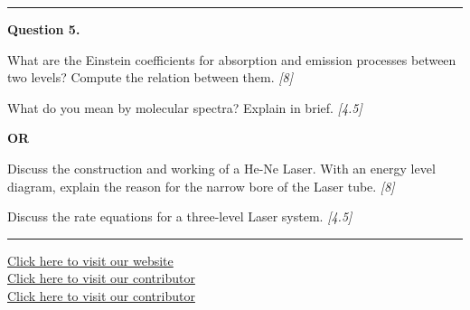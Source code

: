\documentclass[11pt,a4paper]{article}
\newcommand{\pts}[1]{\hfill   \textit{[#1]}}
\begin{document}
\medskip\rule{\linewidth}{0.2pt}




\noindent   \textbf{Question 5.}

\begin{parts}
  \item What are the Einstein coefficients for absorption and emission processes between two levels? Compute the relation between them. \pts{8}
  \item What do you mean by molecular spectra? Explain in brief. \pts{4.5}
\end{parts}
\hfill   \textbf{OR}

\begin{parts}
  \item Discuss the construction and working of a He-Ne Laser. With an energy level diagram, explain the reason for the narrow bore of the Laser tube. \pts{8}
  \item Discuss the rate equations for a three-level Laser system. \pts{4.5}
\end{parts}

\vfill
\rule{\linewidth}{0.4pt}

\begin{center}\small
  \href{https://bhu-exam.vercel.app/}{Click here to visit our website}\\[4pt]
  \href{https://me-aryan.vercel.app/}{Click here to visit our contributor}\\[4pt]
  \href{https://quashan-me.vercel.app/}{Click here to visit our contributor}
\end{center}
\end{document}
